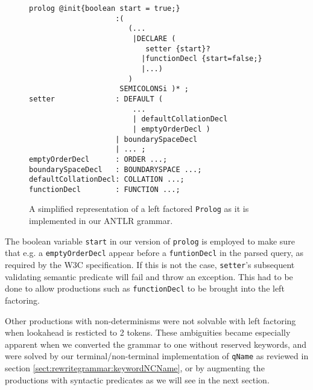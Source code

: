 \begin{figure}[h!]
\begin{Verbatim}
prolog @init{boolean start = true;}
                    :(
                       (...
                        |DECLARE (
                           setter {start}?
                          |functionDecl {start=false;}
                          |...)
                       )
                     SEMICOLONSi )* ;
setter              : DEFAULT (
                        ...
                        | defaultCollationDecl
                        | emptyOrderDecl )
                    | boundarySpaceDecl
                    | ... ;
emptyOrderDecl      : ORDER ...;
boundarySpaceDecl   : BOUNDARYSPACE ...;
defaultCollationDecl: COLLATION ...;
functionDecl        : FUNCTION ...;
\end{Verbatim}
\label{fig:antlrFactored}
\caption[\texttt{Prolog} left factored.]{A simplified representation of a left factored \texttt{Prolog} as it is implemented in our ANTLR grammar.}
\end{figure}

The boolean variable \verb!start! in our version of \verb!prolog! is employed to make sure that e.g. a \verb!emptyOrderDecl! appear before a \verb!funtionDecl! in the parsed query, as required by the W3C specification. If this is not the case, \verb!setter!'s subsequent validating semantic predicate will fail and throw an exception. This had to be done to allow productions such as \verb!functionDecl! to be brought into the left factoring.

Other productions with non-determinisms were not solvable with left factoring when lookahead is resticted to 2 tokens. These ambiguities became especially apparent when we converted the grammar to one without reserved keywords, and were solved by our terminal/non-terminal implementation of \verb!qName! as reviewed in section \ref{sect:rewritegrammar:keywordNCName}, or by augmenting the productions with syntactic predicates as we will see in the next section.
